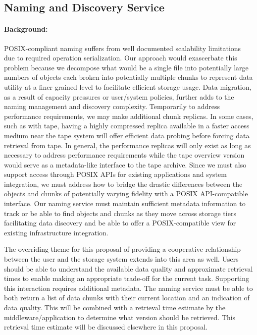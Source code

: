 \subsection{Naming and Discovery Service}
\label{sec:naming-discovery}
\paragraph{Background:}
POSIX-compliant naming suffers from well documented scalability limitations due
to required operation serialization. Our approach would exascerbate this
problem because we decompose what would be a single file into potentially large
numbers of objects each broken into potentially multiple chunks to represent
data utility at a finer grained level to facilitate efficient storage usage.
Data migration, as a result of capacity pressures or user/system policies,
further adds to the naming management and discovery complexity.  Temporarily to
address performance requirements, we may make additional chunk replicas. In
some cases, such as with tape, having a highly compressed replica available in
a faster access medium near the tape system will offer efficient data probing
before forcing data retrieval from tape. In general, the performance replicas
will only exist as long as necessary to address performance requirements while
the tape overview version would serve as a metadata-like interface to the tape
archive. Since we must also support access through POSIX APIs for existing
applications and system integration, we must address how to bridge the drastic
differences between the objects and chunks of potentially varying fidelity with
a POSIX API-compatible interface.  Our naming service must maintain sufficient
metadata information to track or be able to find objects and chunks as they
move across storage tiers facilitating data discovery and be able to offer a
POSIX-compatible view for existing infrastructure integration.

The overriding theme for this proposal of providing a cooperative relationship
between the user and the storage system extends into this area as well.
Users should be able to understand the available data quality and approximate
retrieval times to enable making an appropriate trade-off for the current task.
Supporting this interaction requires additional metadata.  The naming service
must be able to both return a list of data chunks with their current
location and an indication of data quality. This will be combined with a
retrieval time estimate by the middleware/application to determine what version
should be retrieved.  This retrieval time estimate will be discussed elsewhere
in this proposal.

